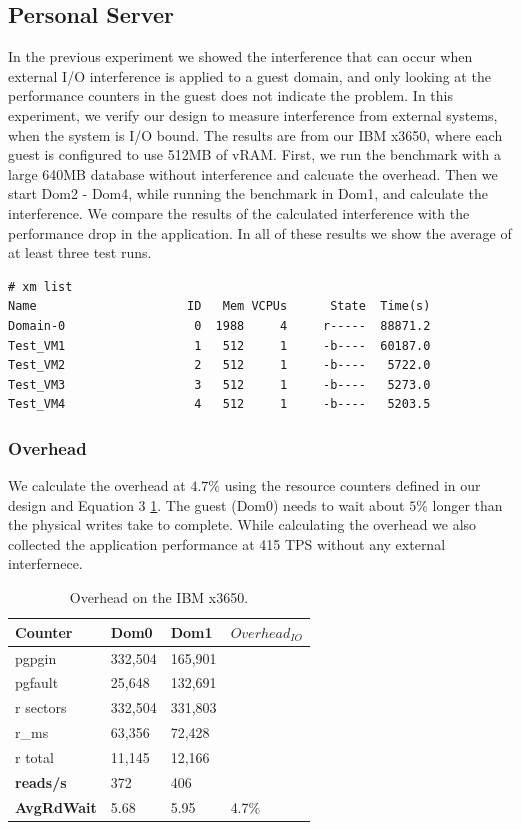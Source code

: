 \subsection{Personal Server}
In the previous experiment we showed the interference that can occur when external I/O interference is applied to a guest domain, and only looking at the performance counters in the guest does not indicate the problem.  In this experiment, we verify our design to measure interference from external systems, when the system is I/O bound.  The results are from our IBM x3650, where each guest is configured to use 512MB of vRAM.  First, we run the benchmark with a large 640MB database without interference and calcuate the overhead.  Then we start Dom2 - Dom4, while running the benchmark in Dom1, and calculate the interference.  We compare the results of the calculated interference with the performance drop in the application.  In all of these results we show the average of at least three test runs.

\begingroup
    \fontsize{10pt}{12pt}\selectfont
\begin{Verbatim}
# xm list
Name                     ID   Mem VCPUs      State  Time(s)
Domain-0                  0  1988     4     r-----  88871.2
Test_VM1                  1   512     1     -b----  60187.0
Test_VM2                  2   512     1     -b----   5722.0
Test_VM3                  3   512     1     -b----   5273.0
Test_VM4                  4   512     1     -b----   5203.5
\end{Verbatim}
\endgroup

\subsubsection{Overhead}
We calculate the overhead at $4.7\%$ using the resource counters defined in our design and Equation 3 \ref{tab:OverheadSmall}.  The guest (Dom0) needs to wait about $5\%$ longer than the physical writes take to complete.  While calculating the overhead we also collected the application performance at 415 TPS without any external interfernece.

\begin{table}[h]
\begin{tabular}{ l l l p{5cm} }
  Counter     & Dom0 & Dom1 & $Overhead_{IO}$ \\
  \hline
	pgpgin    & 332,504 & 165,901  &  \\
	pgfault   &  25,648 & 132,691  & \\
	r sectors & 332,504 & 331,803  &\\
	r\_ms     &  63,356 &  72,428  & \\
	r total   &  11,145 &  12,166  & \\
    \textbf{reads/s}    & 372 & 406 & \\
    \textbf{AvgRdWait}  & 5.68 & 5.95 & 4.7\% \\ 
  \hline
\end{tabular}
\caption{Overhead on the IBM x3650.}
\label{tab:OverheadSmall}
\end{table}

